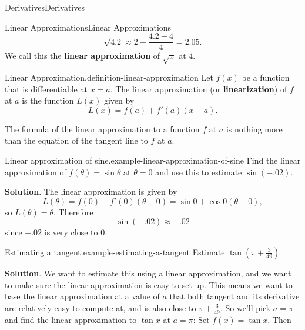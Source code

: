 \documentclass[10pt,]{book}
\newcommand{\terminology}[1]{\textbf{#1}}
\numberwithin{equation}{section}
\begin{document}
\begin{chapterptx}{Derivatives}{}{Derivatives}{}{}
\begin{sectionptx}{Linear Approximations}{}{Linear Approximations}{}{}
\begin{equation*}
\sqrt{4.2} \approx 2 + \frac{4.2 - 4}{4} = 2.05.
\end{equation*}
We call this the \terminology{linear approximation} of \(\sqrt{x}\) at \(4\).%
\begin{definition}{Linear Approximation.}{definition-linear-approximation}%
\hypertarget{p-177}{}%
Let \(f(x)\) be a function that is differentiable at \(x=a\). The linear approximation (or \terminology{linearization}) of \(f\) at \(a\) is the function \(L(x)\) given by%
\begin{equation*}
L(x) = f(a) + f'(a)(x-a).
\end{equation*}
%
\end{definition}
\hypertarget{p-178}{}%
The formula of the linear approximation to a function \(f\) at \(a\) is nothing more than the equation of the tangent line to \(f\) at \(a\).%
\begin{example}{Linear approximation of sine.}{example-linear-approximation-of-sine}%
\hypertarget{p-179}{}%
Find the linear approximation of \(f(\theta) = \sin\theta\) at \(\theta=0\) and use this to estimate \(\sin(-.02)\).%
\par\smallskip%
\noindent\textbf{Solution}.\hypertarget{solution-39}{}\quad%
\hypertarget{p-180}{}%
The linear approximation is given by%
\begin{equation*}
L(\theta) = f(0) + f'(0)(\theta - 0) = \sin0 + \cos0 (\theta - 0),
\end{equation*}
so \(L(\theta) = \theta\). Therefore%
\begin{equation*}
\sin(-.02)\approx-.02
\end{equation*}
since \(-.02\) is very close to \(0\).%
\end{example}
\begin{example}{Estimating a tangent.}{example-estimating-a-tangent}%
\hypertarget{p-181}{}%
Estimate \(\tan(\pi+\frac{3}{49})\).%
\par\smallskip%
\noindent\textbf{Solution}.\hypertarget{solution-40}{}\quad%
\hypertarget{p-182}{}%
We want to estimate this using a linear approximation, and we want to make sure the linear approximation is easy to set up. This means we want to base the linear approximation at a value of \(a\) that both tangent and its derivative are relatively easy to compute at, and is also close to \(\pi+\frac{3}{49}\). So we'll pick \(a=\pi\) and find the linear approximation to \(\tan x\) at \(a = \pi\): Set \(f(x) = \tan x\). Then%
\begin{align*}

\end{align*}
\end{example}
\end{sectionptx}
\end{chapterptx}
\end{document}
